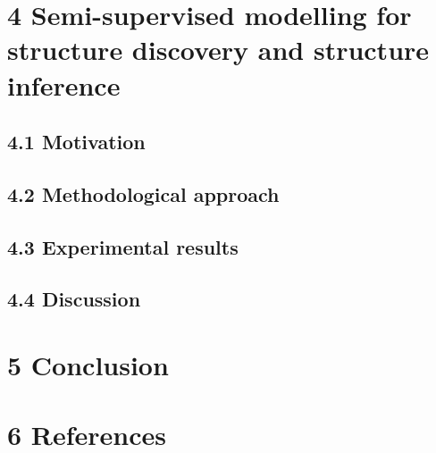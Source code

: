 \documentclass[authoryear,review,3p]{elsarticle}
\begin{document}
\section*{4 Semi-supervised modelling for structure discovery
and structure inference}

\subsection*{4.1 Motivation}
\subsection*{4.2 Methodological approach}
\subsection*{4.3 Experimental results}
\subsection*{4.4 Discussion}




\section*{5 Conclusion}






\bigskip
\section*{6 References}



\end{document}
